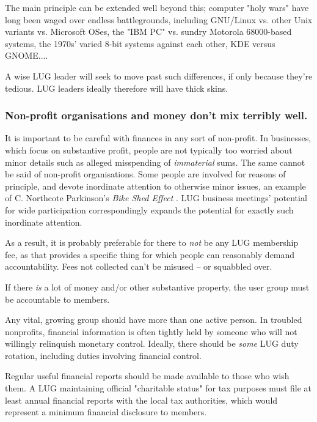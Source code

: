  
The main principle can be extended well beyond this; computer "holy
wars" have long been waged over endless battlegrounds, including 
GNU/Linux vs. other Unix variants vs. Microsoft OSes, the "IBM PC" vs.
sundry Motorola 68000-based systems, the 1970s' varied 8-bit systems 
against each other, KDE versus GNOME....



A wise LUG leader will seek to move past such differences, if only
because they're tedious.  LUG leaders ideally therefore will have thick
skins.




\subsubsection{Non-profit organisations and money don't mix terribly well.}

It is important to be careful with finances in any sort of non-profit.
In businesses, which focus on substantive profit, people are not
typically too worried about minor details such as alleged misspending of
{\itshape immaterial\/} sums.  The same cannot be said of non-profit
organisations.  Some people are involved for reasons of principle, and
devote inordinate attention to otherwise minor issues, an example of C.
Northcote Parkinson's 
\emph{Bike Shed Effect} \texttt{\aeturl}
.  LUG business
meetings' potential for wide participation correspondingly expands the
potential for exactly such inordinate attention.



As a result, it is probably preferable for there to {\itshape not\/} be any
LUG membership fee, as that provides a specific thing for which people
can reasonably demand accountability.  Fees not collected can't be
misused -- or squabbled over.



If there {\itshape is\/} a lot of money and/or other substantive property,
the user group must be accountable to members.



Any vital, growing group should have more than one active person.  In
troubled nonprofits, financial information is often tightly held by
someone who will not willingly relinquish monetary control. Ideally,
there should be {\itshape some\/} LUG duty rotation, including duties
involving financial control.



Regular useful financial reports should be made available to those
who wish them. A LUG maintaining official "charitable status"
for tax purposes must file at least annual financial reports
with the local tax authorities, which would represent a minimum
financial disclosure to members.



